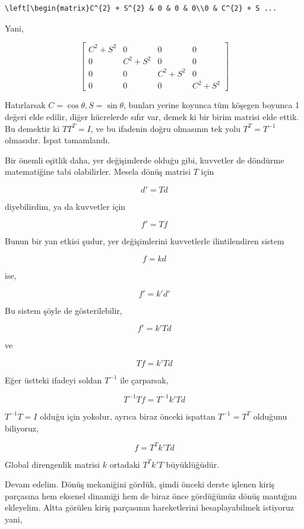 \documentclass[12pt,fleqn]{article}\usepackage{../../common}
\begin{document}
\begin{verbatim}
\left[\begin{matrix}C^{2} + S^{2} & 0 & 0 & 0\\0 & C^{2} + S ...
\end{verbatim}

Yani,
  
$$
\left[\begin{matrix}C^{2} + S^{2} & 0 & 0 & 0\\0 & C^{2} + S^{2} & 0 & 0\\0 & 0 & C^{2} + S^{2} & 0\\0 & 0 & 0 & C^{2} + S^{2}\end{matrix}\right]
$$

Hatırlarsak $C = \cos\theta, S = \sin\theta$, bunları yerine koyunca tüm köşegen
boyunca 1 değeri elde edilir, diğer hücrelerde sıfır var, demek ki bir birim
matrisi elde ettik. Bu demektir ki $T T^T = I$, ve bu ifadenin doğru olmasının
tek yolu $T^T = T^{-1}$ olmasıdır. İspat tamamlandı.

Bir önemli eşitlik daha, yer değişimlerde olduğu gibi, kuvvetler de döndürme
matematiğine tabi olabilirler. Mesela dönüş matrisi $T$ için

$$
d' = T d
$$

diyebilirdim, ya da kuvvetler için

$$
f' = T f
$$

Bunun bir yan etkisi şudur, yer değişimlerini kuvvetlerle ilintilendiren
sistem

$$
f = k d
$$

ise,

$$
f' = k' d' 
$$

Bu sistem şöyle de gösterilebilir,

$$
f' = k' T d
$$

ve

$$
T f = k' T d
$$

Eğer üstteki ifadeyi soldan $T^{-1}$ ile çarparsak,

$$
T^{-1} T f = T^{-1} k' T d
$$

$T^{-1} T = I$ olduğu için yokolur, ayrıca biraz önceki ispattan $T^{-1} = T^T$
olduğunu biliyoruz,

$$
f = T^T k' T d
$$

Global direngenlik matrisi $k$ ortadaki $T^T k' T$ büyüklüğüdür.

Devam edelim. Dönüş mekaniğini gördük, şimdi önceki derste işlenen kiriş
parçasına hem eksenel dinamiği hem de biraz önce gördüğümüz dönüş mantığını
ekleyelim.  Altta görülen kiriş parçasının hareketlerini hesaplayabilmek
istiyoruz yani,
\end{document}
